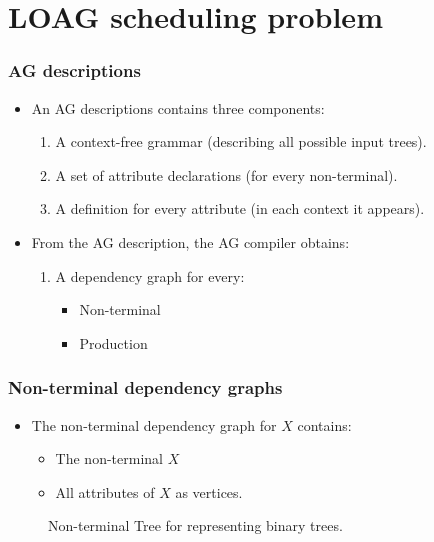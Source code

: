 \documentclass{beamer}
\begin{document}
\section{LOAG scheduling problem}
\begin{frame}
    \frametitle{AG descriptions}
    \begin{itemize}
        \item An AG descriptions contains three components:
        \begin{enumerate}
            \item A context-free grammar (describing all possible input trees).
            \item A set of attribute declarations (for every non-terminal).
            \item A definition for every attribute (in each context it appears).
        \end{enumerate}
        \item From the AG description, the AG compiler obtains:
        \begin{enumerate}
            \item A dependency graph for every:
                \begin{itemize} 
                    \item Non-terminal
                    \item Production
                \end{itemize}
        \end{enumerate}
    \end{itemize}
\end{frame}

\begin{frame}
    \frametitle{Non-terminal dependency graphs}
    \begin{itemize}
        \item The non-terminal dependency graph for $X$ contains:
            \begin{itemize}
                \item The non-terminal $X$ 
                \item All attributes of $X$ as vertices.
            \end{itemize}
    \end{itemize}
    \begin{figure}
    \caption{Non-terminal Tree for representing binary trees.}
    \end{figure}
\end{frame}
\end{document}
